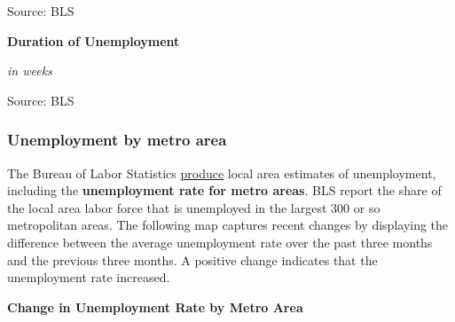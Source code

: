 \documentclass{report}
\makeatletter
\newcommand{\tbllink}[1]{\href{https://raw.githubusercontent.com/bdecon/US-chartbook/master/chartbook/data/#1}{\faTable}}
\newcommand*\short[1]{\expandafter\@gobbletwo\number\numexpr#1\relax}
\newcommand{\stdnode}[3]{\node[below, align=left, shift=({#1,#2})]{#3};}
\newcommand{\dateaxisticks}{
		date coordinates in=x, axis line style={draw=none},
		xmax={2020-10-01},
		max space between ticks=40,	    
		xtick={{1990-01-01}, {1992-01-01}, {1994-01-01}, 
			{1996-01-01}, {1998-01-01}, {2000-01-01}, 
			{2002-01-01}, {2004-01-01}, {2006-01-01},
			{2008-01-01}, {2010-01-01}, {2012-01-01}, {2014-01-01},
		    {2016-01-01}, {2018-01-01}, {2020-01-01}},
		minor xtick={{1989-01-01}, {1991-01-01}, {1993-01-01},
			{1995-01-01}, {1997-01-01}, {1999-01-01}, 
			{2001-01-01}, {2003-01-01}, {2005-01-01}, {2007-01-01},
		    {2009-01-01}, {2011-01-01}, {2013-01-01}, {2015-01-01},
		    {2017-01-01}, {2019-01-01}},
		enlarge y limits={0.06}, enlarge x limits={0.01},
		}
\newcommand{\bbar}[2]{extra #1 ticks = {{#2}}, extra #1 tick labels = ,
		extra #1 tick style = {grid=major, grid style={thick, black!25}},}
\newcommand{\stdline}[4]{\addplot[very thick, no markers, color=#1] 
		table [x=#2, y=#3, col sep=comma] {#4};	}
\newcommand{\rbars}{
		\fill[color=black!10] (axis cs:{1990-07-01},\pgfkeysvalueof{/pgfplots/ymin}) rectangle 
			(axis cs:{1991-03-01}, \pgfkeysvalueof{/pgfplots/ymax});
		\fill[color=black!10] (axis cs:{2007-12-01},\pgfkeysvalueof{/pgfplots/ymin}) rectangle 
			(axis cs:{2009-07-01}, \pgfkeysvalueof{/pgfplots/ymax});
		\fill[color=black!10] (axis cs:{2001-03-01},\pgfkeysvalueof{/pgfplots/ymin}) rectangle 
			(axis cs:{2001-11-01}, \pgfkeysvalueof{/pgfplots/ymax});
		\fill[color=black!10] (axis cs:{2020-02-01},\pgfkeysvalueof{/pgfplots/ymin}) rectangle 
			(axis cs:{2020-10-01}, \pgfkeysvalueof{/pgfplots/ymax});}
\makeatother
\begin{document}
{{{{{{{{{\begin{minipage}{0.37\textwidth}
\footnotesize{Source: BLS} \hfill \tbllink{ltu.csv}
\end{minipage}

\vspace{4mm}

\begin{minipage}{0.76\textwidth} 
\small 

\vspace{3mm}

\normalsize \textbf{Duration of Unemployment}

\footnotesize{\textit{in weeks}}

\hspace*{-2mm} 

\footnotesize{Source: BLS} \hfill \tbllink{unempdur.csv}
\end{minipage}
\newpage

\subsubsection*{\color{black!70} \seriffont Unemployment by metro area}

\begin{minipage}{0.76\textwidth}


\small The Bureau of Labor Statistics \href{https://www.bls.gov/lau/}{produce} local area estimates of unemployment, including the \textbf{unemployment rate for metro areas}. BLS report the share of the local area labor force that is unemployed in the largest 300 or so metropolitan areas. The following map captures recent changes by displaying the difference between the average unemployment rate over the past three months and the previous three months. A positive change indicates that the unemployment rate increased. 

\vspace{4mm}

\normalsize \textbf{Change in Unemployment Rate by Metro Area}


\end{minipage}}}}}}}}}}
\end{document}
